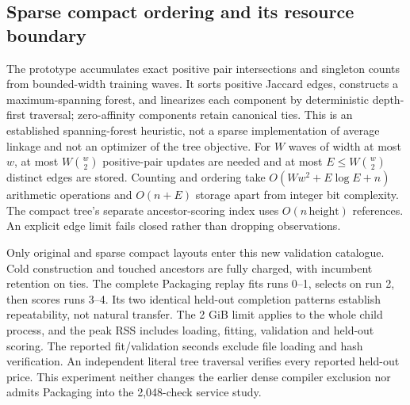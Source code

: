 \subsection{Sparse compact ordering and its resource boundary}
The prototype accumulates exact positive pair intersections and singleton
counts from bounded-width training waves. It sorts positive Jaccard edges,
constructs a maximum-spanning forest, and linearizes each component by
deterministic depth-first traversal; zero-affinity components retain canonical
ties. This is an established spanning-forest heuristic, not a sparse
implementation of average linkage and not an optimizer of the tree objective.
For $W$ waves of width at most $w$, at most $W\binom w2$ positive-pair
updates are needed and at most $E\le W\binom w2$ distinct edges are stored.
Counting and ordering take $O(Ww^2+E\log E+n)$ arithmetic operations and
$O(n+E)$ storage apart from integer bit complexity. The compact tree's
separate ancestor-scoring index uses $O(n\,\mathrm{height})$ references.
An explicit edge limit fails closed rather than dropping observations.

Only original and sparse compact layouts enter this new validation catalogue.
Cold construction and touched ancestors are fully charged, with incumbent
retention on ties. The complete Packaging replay fits runs 0--1, selects on
run 2, then scores runs 3--4. Its two identical held-out completion patterns
establish repeatability, not natural transfer. The 2 GiB limit applies to the
whole child process, and the peak RSS includes loading, fitting, validation
and held-out scoring. The reported fit/validation seconds exclude file loading
and hash verification. An independent literal tree traversal verifies every
reported held-out price. This experiment neither changes the earlier dense
compiler exclusion nor admits Packaging into the 2,048-check service study.

